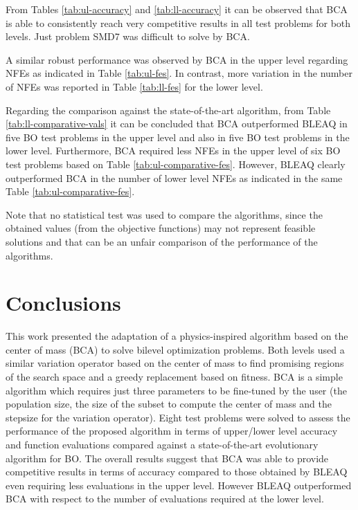\documentclass[conference]{IEEEtran}
\begin{document}
From Tables \ref{tab:ul-accuracy} and \ref{tab:ll-accuracy} it can be observed
that BCA is able to consistently reach very competitive results in all test problems
for both levels. Just problem SMD7 was difficult to solve by BCA. 

A similar robust performance was observed by BCA in the upper level regarding NFEs
as indicated in Table \ref{tab:ul-fes}. In contrast, more variation in the number
of NFEs was reported in Table \ref{tab:ll-fes} for the lower level. 



Regarding the comparison against the state-of-the-art algorithm, from Table \ref{tab:ll-comparative-vals}
it can be concluded that BCA outperformed BLEAQ in five BO test problems in the
upper level and also in five BO test problems in the lower level. Furthermore,
BCA required less NFEs in the upper level of six BO test problems based on
Table \ref{tab:ul-comparative-fes}. However, BLEAQ clearly outperformed BCA in
the number of lower level NFEs as indicated in the same Table \ref{tab:ul-comparative-fes}.

Note that no statistical test was used to compare the algorithms, since the
obtained values (from the objective functions) may not represent feasible solutions
and that can be an unfair comparison of the performance of the algorithms.



\section{Conclusions}
\label{sec:conclu}

This work presented the adaptation of a physics-inspired algorithm based on the
center of mass (BCA) to solve bilevel optimization problems. Both levels used a
similar variation operator based on the center of mass to find promising regions
of the search space and a greedy replacement based on fitness. BCA is a simple
algorithm which requires just three parameters to be fine-tuned by the user (the
population size, the size of the subset to compute the center of mass and the
stepsize for the variation operator). Eight test problems were solved to assess
the performance of the proposed algorithm in terms of upper/lower level accuracy
and function evaluations compared against a state-of-the-art evolutionary algorithm
for BO. The overall results suggest that BCA was able to provide competitive
results in terms of accuracy compared to those obtained by BLEAQ even requiring
less evaluations in the upper level. However BLEAQ outperformed BCA with respect
to the number of evaluations required at the lower level.
\end{document}
